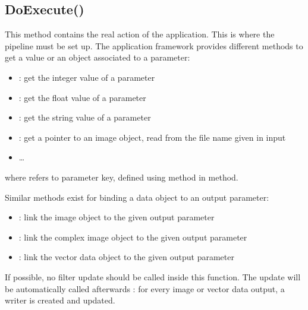 \subsection{DoExecute()}
\label{sec:appDoExecute}
This method contains the real action of the application. This is where the pipeline 
must be set up. The application framework provides different methods to get a value 
or an object associated to a parameter:
\begin{itemize}
  \item {} : get the integer value of a parameter
  \item {} : get the float value of a parameter
  \item {} : get the string value of a parameter
  \item {} : get a pointer to an image object, read from the
  file name given in input
  \item \dots
\end{itemize}

where  refers to parameter key, defined using  method in  method.

Similar methods exist for binding a data object to an output parameter:
\begin{itemize}
  \item {} : link the image object to the given output parameter
  \item {} : link the complex image object to the given output parameter
  \item {} : link the vector data object to the given
  output parameter
\end{itemize}

If possible, no filter update should be called inside this function. The update will be 
automatically called afterwards : for every image or vector data output, a writer is 
created and updated.

